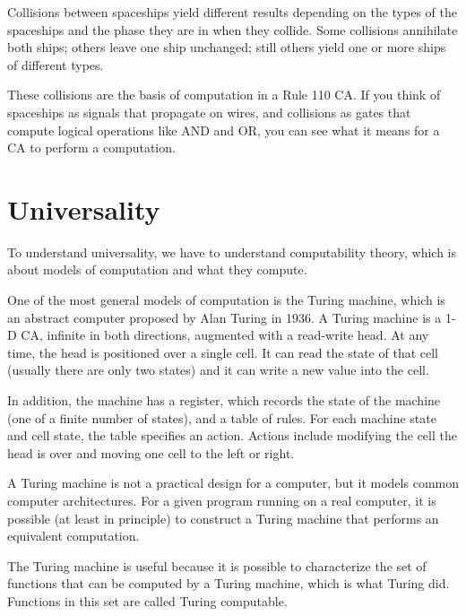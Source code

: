 \documentclass[12pt]{book}
\theoremstyle{exercise}
\begin{document}

Collisions between spaceships yield different results
depending on the types of the spaceships and the phase they are in
when they collide.  Some collisions annihilate both ships; others
leave one ship unchanged; still others yield one or more ships of
different types.

These collisions are the basis of computation in a Rule 110 CA.  If
you think of spaceships as signals that propagate on wires, and
collisions as gates that compute logical operations like AND and OR,
you can see what it means for a CA to perform a computation.


\section{Universality}

To understand universality, we have to understand computability
theory, which is about models of computation and what they compute.


One of the most general models of computation is the Turing machine,
which is an abstract computer proposed by Alan Turing in 1936.  A
Turing machine is a 1-D CA, infinite in both directions, augmented
with a read-write head.  At any time, the head is positioned over a
single cell.  It can read the state of that cell (usually there are
only two states) and it can write a new value into the cell.


In addition, the machine has a register, which records the state
of the machine (one of a finite number of states), and a table
of rules.  For each machine state and cell state, the table
specifies an action.  Actions include modifying the cell
the head is over and moving one cell to the left or right.

A Turing machine is not a practical design for a computer, but it
models common computer architectures.  For a given program running on
a real computer, it is possible (at least in principle) to construct a
Turing machine that performs an equivalent computation.

The Turing machine is useful because it is possible to characterize
the set of functions that can be computed by a Turing machine,
which is what Turing did.  Functions in this set are
called Turing computable.
\end{document}
